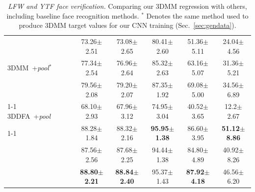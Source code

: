 \documentclass[10pt,twocolumn,letterpaper]{article}
\def\tbf#1{\textbf{#1}}
\newcommand{\cmark}{\ding{51}}%
\newcommand{\xmark}{\ding{53}}%
\begin{document}
\begin{table}[tb]
{\begin{tabular}{lccccccc}
\multirow{3}{*}{3DMM~\cite{romdhani2005estimating}+{\em pool}$^*$} & \cmark & \xmark & 73.26$\pm$2.51 & 73.08$\pm$2.65 & 80.41$\pm$2.60 & 51.36$\pm$5.11 & 24.04$\pm$4.56 \\
& \xmark & \cmark & 77.34$\pm$2.54 & 76.96$\pm$2.64 & 85.32$\pm$2.63 & 63.16$\pm$5.07 & 31.36$\pm$5.21 \\
& \cmark & \cmark & 79.56$\pm$2.08 & 79.20$\pm$2.07 & 87.35$\pm$1.92 & 69.08$\pm$5.00 & 34.56$\pm$6.89 \\
\cmidrule(r){1-1}
3DDFA~\cite{Zhu2016Face}+{\em pool}& \cmark & \xmark & 68.10$\pm$2.93 & 67.96$\pm$3.12 & 74.95$\pm$3.04 & 40.52$\pm$3.65 & 12.2$\pm$2.67 \\
\cmidrule(r){1-1}
\multirow{3}{*}{Us \emph{+pool}}
& \cmark & \xmark &  88.28$\pm$1.84 & 88.32$\pm$2.16 & \tbf{95.95$\pm$1.38} & 86.60$\pm$3.95 & \tbf{51.12$\pm$8.86} \\
& \xmark & \cmark  & 87.56$\pm$2.56 & 87.68$\pm$2.25 & 94.44$\pm$1.38 & 84.80$\pm$4.89 & 40.92$\pm$8.26 \\ 
& \cmark & \cmark & \tbf{88.80$\pm$2.21} & \tbf{88.84$\pm$2.40}  & 95.37$\pm$1.43 & \tbf{87.92$\pm$4.18} & 46.56$\pm$6.20 \\ 
\bottomrule
\end{tabular}
}
\caption{{\em LFW and YTF face verification.} Comparing our 3DMM regression with others, including baseline face recognition methods. $^*$ Denotes the same method used to produce 3DMM target values for our CNN training (Sec.~\ref{sec:gendata}).}
\vspace{-3mm}
\label{tab:lfw-ytf}
\end{table}
\end{document}
